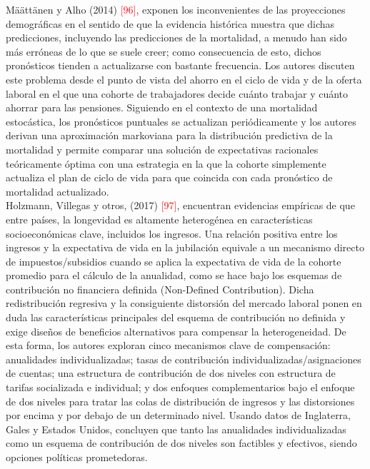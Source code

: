M\"a\"att\"anen y Alho (2014) \textcolor{red}{[96]}, exponen los inconvenientes de las proyecciones demográficas en el sentido de que la evidencia histórica muestra que dichas predicciones, incluyendo las predicciones de la mortalidad, a menudo han sido más erróneas de lo que se suele creer; como consecuencia de esto, dichos pronósticos tienden a actualizarse con bastante frecuencia. Los autores discuten este problema desde el punto de vista del ahorro en el ciclo de vida y de la oferta laboral en el que una cohorte de trabajadores decide cuánto trabajar y cuánto ahorrar para las pensiones. Siguiendo en el contexto de una mortalidad estocástica, los pronósticos puntuales se actualizan periódicamente y los autores derivan una aproximación markoviana para la distribución predictiva de la mortalidad y permite comparar una solución de expectativas racionales teóricamente óptima con una estrategia en la que la cohorte simplemente actualiza el plan de ciclo de vida para que coincida con cada pronóstico de mortalidad actualizado.\\

Holzmann, Villegas y otros, (2017) \textcolor{red}{[97]}, encuentran evidencias empíricas de que entre países, la longevidad es altamente heterogénea en características socioeconómicas clave, incluidos los ingresos. Una relación positiva entre los ingresos y la expectativa de vida en la jubilación equivale a un mecanismo directo de impuestos/subsidios cuando se aplica la expectativa de vida de la cohorte promedio para el cálculo de la anualidad, como se hace bajo los esquemas de contribución no financiera definida (Non-Defined Contribution). Dicha redistribución regresiva y la consiguiente distorsión del mercado laboral ponen en duda las características principales del esquema de contribución no definida y exige diseños de beneficios alternativos para compensar la heterogeneidad. De esta forma, los autores exploran cinco mecanismos clave de compensación: anualidades individualizadas; tasas de contribución individualizadas/asignaciones de cuentas; una estructura de contribución de dos niveles con estructura de tarifas socializada e individual; y dos enfoques complementarios bajo el enfoque de dos niveles para tratar las colas de distribución de ingresos y las distorsiones por encima y por debajo de un determinado nivel. Usando datos de Inglaterra, Gales y Estados Unidos, concluyen que tanto las anualidades individualizadas como un esquema de contribución de dos niveles son factibles y efectivos, siendo opciones políticas prometedoras.\\

